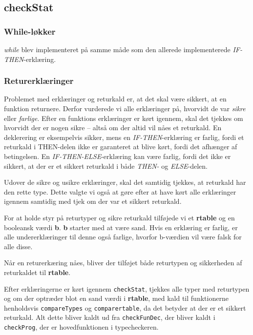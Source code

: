 \documentclass[a4paper, 10pt]{article}
\begin{document}
\subsection{checkStat}
\subsubsection{While-løkker}
\textit{while} blev implementeret på samme måde som den allerede implementerede 
\textit{IF-THEN}-erklæring.

\subsubsection{Returerklæringer}
Problemet med erklæringer og returkald er, at det skal være sikkert, at en
funktion returnere. Derfor vurderede vi alle erklæringer på, hvorvidt de var
\textit{sikre} eller \textit{farlige}. Efter en funktions erklæringer er kørt
igennem, skal det tjekkes om hvorvidt der er nogen sikre -- altså om der altid
vil nåes et returkald.
En deklerering er eksempelvis sikker, mens en \textit{IF-THEN}-erklæring er
farlig, fordi et returkald i THEN-delen ikke er garanteret at blive kørt, fordi
det afhænger af betingelsen. En \textit{IF-THEN-ELSE}-erklæring kan være farlig,
fordi det ikke er sikkert, at der er et sikkert returkald i både \textit{THEN-}
og \textit{ELSE}-delen.

Udover de sikre og usikre erklæringer, skal det samtidig tjekkes, at returkald
har den rette type. Dette valgte vi også at gøre efter at have kørt alle
erklæringer igennem samtidig med tjek om der var et sikkert returkald.

For at holde styr på returtyper og sikre returkald tilføjede vi
et \textbf{rtable} og en booleansk værdi \textbf{b}. \textbf{b} starter med at
være sand. Hvis en erklæring er farlig, er alle undererklæringer til denne også
farlige, hvorfor b-værdien vil være falsk for alle disse.

Når en returerkæring nåes, bliver der tilføjet både returtypen
og sikkerheden af returkaldet til \textbf{rtable}.

Efter erklæringerne er kørt igennem \texttt{checkStat}, tjekkes alle typer med returtypen og om
der optræder blot en sand værdi i \textbf{rtable}, med kald til funktionerne henholdsvis \texttt{compareTypes} og \texttt{comparertable}, da det betyder at der er et sikkert returkald. Alt dette bliver kaldt ud fra \texttt{checkFunDec}, der bliver kaldt i \texttt{checkProg}, der er hovedfunktionen i typecheckeren.
\end{document}

